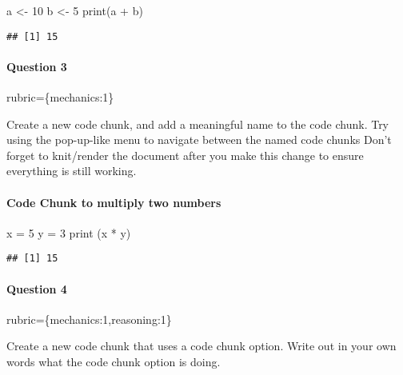 \documentclass[
]{article}
\newenvironment{Shaded}{\begin{snugshade}}{\end{snugshade}}
\newcommand{\DecValTok}[1]{\textcolor[rgb]{0.00,0.00,0.81}{#1}}
\newcommand{\FunctionTok}[1]{\textcolor[rgb]{0.00,0.00,0.00}{#1}}
\newcommand{\NormalTok}[1]{#1}
\newcommand{\OtherTok}[1]{\textcolor[rgb]{0.56,0.35,0.01}{#1}}
\newcommand{\SpecialCharTok}[1]{\textcolor[rgb]{0.00,0.00,0.00}{#1}}
\begin{document}
\begin{Shaded}
\begin{Highlighting}[]
\NormalTok{a }\OtherTok{\textless{}{-}} \DecValTok{10}
\NormalTok{b }\OtherTok{\textless{}{-}} \DecValTok{5}
\FunctionTok{print}\NormalTok{(a }\SpecialCharTok{+}\NormalTok{ b)}
\end{Highlighting}
\end{Shaded}

\begin{verbatim}
## [1] 15
\end{verbatim}

\begin{alert alert-info}
\hypertarget{question-3}{%
\paragraph{Question 3}\label{question-3}}

rubric=\{mechanics:1\}

Create a new code chunk, and add a meaningful name to the code chunk.
Try using the pop-up-like menu to navigate between the named code chunks
Don't forget to knit/render the document after you make this change to
ensure everything is still working.
\end{alert alert-info}

\hypertarget{code-chunk-to-multiply-two-numbers}{%
\paragraph{Code Chunk to multiply two
numbers}\label{code-chunk-to-multiply-two-numbers}}

\begin{Shaded}
\begin{Highlighting}[]
\NormalTok{x }\OtherTok{=} \DecValTok{5}
\NormalTok{y }\OtherTok{=} \DecValTok{3}
\FunctionTok{print}\NormalTok{ (x }\SpecialCharTok{*}\NormalTok{ y)}
\end{Highlighting}
\end{Shaded}

\begin{verbatim}
## [1] 15
\end{verbatim}

\begin{alert alert-info}
\hypertarget{question-4}{%
\paragraph{Question 4}\label{question-4}}

rubric=\{mechanics:1,reasoning:1\}

Create a new code chunk that uses a code chunk option. Write out in your
own words what the code chunk option is doing.
\end{alert alert-info}
\end{document}
